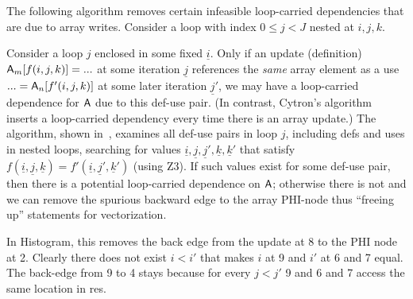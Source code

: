 The following algorithm removes certain infeasible loop-carried dependencies that are due to array writes. Consider a loop with index $0 \le j < J$
nested at $i,j,k$. 
\begin{comment}
\begin{algorithmic}
\FOR {each array ${\sf A}$ written in loop $j$}
\STATE \COMMENT { including enclosed loops in $j$ }
\STATE dep = False
\FOR {each pair def: ${\sf A}_m[f(i,j,k)] = ... $, and use: $ ... = {\sf A}_n[f'(i,j,k)]$ in loop $j$}
\IF {$\exists \underline{i}, \underline{j}, \underline{j}', \underline{k}, \underline{k}'$, s.t. $0\! \le\! \underline{i}\! <\! I,\: 0\! \le\! \underline{j}, \underline{j}' \! <\! J,\: 0\! \le\! \underline{k}, \underline{k}' \! <\! K,\: \underline{j}<\underline{j}'$, and $f(\underline{i},\underline{j},\underline{k}) = f'(\underline{i},\underline{j}',\underline{k}')$}
\STATE dep = True
\ENDIF
\ENDFOR
\IF {dep == False}
\STATE remove back edge into ${\sf A}$'s $\phi$-node in loop $j$.
\ENDIF
\ENDFOR
\end{algorithmic}
\end{comment}
Consider a loop $j$ enclosed in some fixed $\underline{i}$. Only if an update (definition) ${\sf A}_m[f(i,j,k)] = ... $ at some iteration $\underline{j}$
references the \emph{same} array element as a use $ ... = {\sf A}_n[f'(i,j,k)]$ at some later iteration $\underline{j}'$,
we may have a loop-carried dependence for ${\sf A}$ due to this def-use pair. (In contrast, Cytron's algorithm inserts a loop-carried dependency every time there is an array update.)
The algorithm, shown in~\cite{Anon_TR}, examines all def-use pairs in loop $j$, including defs and uses in nested loops, 
searching for values $\underline{i}, \underline{j}, \underline{j}', \underline{k}, \underline{k}'$ that satisfy
$f(\underline{i},\underline{j},\underline{k}) = f'(\underline{i},\underline{j}',\underline{k}')$ (using Z3). If such values exist for some def-use pair, then there is a potential
loop-carried dependence on ${\sf A}$; otherwise there is not and we can remove the spurious backward edge to the array PHI-node 
thus ``freeing up'' statements for vectorization. %

In Histogram, this removes the back edge from the update at 8 to the PHI node at 2. Clearly there does not exist $i < i'$ that makes
$i$ at 9 and $i'$ at 6 and 7 equal. The back-edge from 9 to 4 stays because for every $j < j'$ 9 and 6 and 7 access the same location in {\sf res}. %

